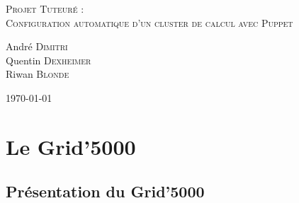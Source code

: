 \documentclass[a4paper, 10pt, onecolumn]{report}
\begin{document}
\newcommand{\bold}[1]{\textbf{#1}}
\newcommand{\italic}[1]{\textit{#1}}
\newcommand{\surligne}[1]{\underline{#1}}
\newcommand{\couleur}[1]{\textcolor{#1}}
\newcommand{\maj}[1]{\textsc{#1}}
\newcommand{\machine}[1]{\texttt{#1}}
\newcommand{\be}{\begin{enumerate}}
\newcommand{\ee}{\end{enumerate}}
\newcommand{\bi}{\begin{itemize}}
\newcommand{\ei}{\end{itemize}}

\pagestyle{fancy}
\fancyhf{}
\rhead{\leftmark}
\rfoot{\thepage}


\begin{titlepage}

\begin{center}


\textsc{\LARGE Projet Tuteuré : \\Configuration automatique d'un cluster de calcul avec Puppet}
\vfill



\vfill

\begin{minipage}{0.99\textwidth}
\begin{flushleft} \large
André \textsc{Dimitri}\\
Quentin \textsc{Dexheimer}\\
Riwan \textsc{Blonde}\\
\end{flushleft}
\end{minipage}
\begin{minipage}{0.99\textwidth}
\begin{flushright} \large
{\large \today}
\end{flushright}
\end{minipage}


\end{center}

\end{titlepage}



\tableofcontents


\chapter{Le Grid'5000}
	\section{Présentation du Grid'5000}
	
\end{document}
